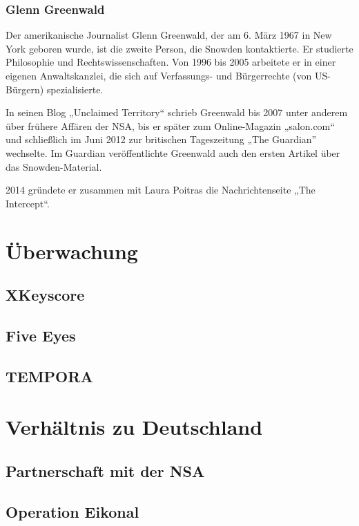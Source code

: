 \documentclass[12pt,a4paper]{scrartcl}
\begin{document}
\subsubsection{Glenn Greenwald}
Der amerikanische Journalist Glenn Greenwald, der am 6. März 1967 in New York geboren wurde, ist die zweite Person, die Snowden kontaktierte. Er studierte Philosophie und Rechtswissenschaften.\cite{wiki_greenwald} Von 1996 bis 2005 arbeitete er in einer eigenen Anwaltskanzlei, die sich auf Verfassungs- und Bürgerrechte (von US-Bürgern) spezialisierte.\cite{unclaimed_response}

In seinen Blog „Unclaimed Territory“ schrieb Greenwald bis 2007 unter anderem über frühere Affären der NSA, bis er später zum Online-Magazin „salon.com“ und schließlich im Juni 2012 zur britischen Tageszeitung „The Guardian” wechselte. Im Guardian veröffentlichte Greenwald auch den ersten Artikel über das Snowden-Material.\cite{wiki_greenwald}

2014 gründete er zusammen mit Laura Poitras die Nachrichtenseite „The Intercept“.\cite{intercept_about}

\section{Überwachung}

\subsection{XKeyscore}


\subsection{Five Eyes}

\subsection{TEMPORA}

\section{Verhältnis zu Deutschland}

\subsection{Partnerschaft mit der NSA}

\subsection{Operation Eikonal}
\end{document}
